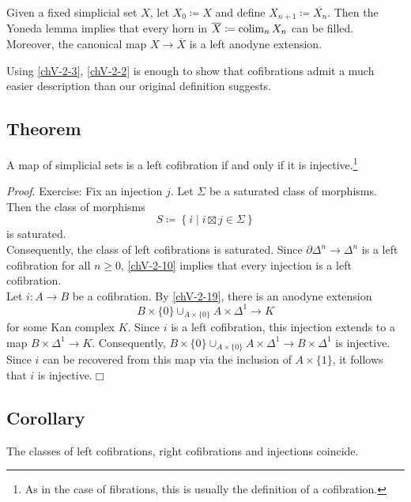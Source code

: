         Given a fixed simplicial set $X$, let $X_0 \coloneq X$ and define $X_{n+1} \coloneq \overline{X_n}$. Then the Yoneda lemma implies that every horn in $\overline{X} \coloneq \operatorname*{colim}_n X_n$ can be filled. Moreover, the canonical map $X \to \overline{X}$ is a left anodyne extension.
        \medskip

        Using \ref{chV-2-3}, \ref{chV-2-2} is enough to show that cofibrations admit a much easier description than our original definition suggests.

    \subsection{Theorem}\label{chV-2-20}
        A map of simplicial sets is a left cofibration if and only if it is injective.\footnote{As in the case of fibrations, this is usually the definition of a cofibration.}
        \smallskip

        \emph{Proof}. Exercise: Fix an injection $j$. Let $\Sigma$ be a saturated class of morphisms. Then the class of morphisms
        \begin{equation*}
            S \coloneq \left\{ i \mid i \boxtimes j \in \Sigma \right\}
        \end{equation*}
        is saturated.\\
        Consequently, the class of left cofibrations is saturated. Since $\partial \Delta^n \to \Delta^n$ is a left cofibration for all $n \geq 0$, \ref{chV-2-10} implies that every injection is a left cofibration.\\
        Let $i \colon A \to B$ be a cofibration. By \ref{chV-2-19}, there is an anodyne extension
        \begin{equation*}
            B \times \{0\} \cup_{A \times \{0\}} A \times \Delta^1 \to K
        \end{equation*}
        for some Kan complex $K$. Since $i$ is a left cofibration, this injection extends to a map $B \times \Delta^1 \to K$. Consequently, $B \times \{0\} \cup_{A \times \{0\}} A \times \Delta^1 \to B \times \Delta^1$ is injective. Since $i$ can be recovered from this map via the inclusion of $A \times \{1\}$, it follows that $i$ is injective.\hfill$\Box$

    \subsection{Corollary}\label{chV-2-21}
        The classes of left cofibrations, right cofibrations and injections coincide.
        \medskip

